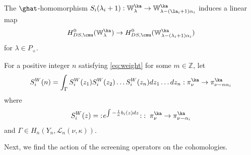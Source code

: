 \documentclass{amsart}
\newcommand{\Wak}[2]{\mathbb{W}_{#1}^{#2}}
\newcommand{\bra}{{\langle}}
\newcommand{\ket}{{\rangle}}
\newcommand{\+}{\mathop{\oplus}}
\renewcommand{\*}{{\otimes}}
\newcommand{\mc}{\mathcal}
\newcommand{\mf}{\mathfrak}
\newcommand{\g}{\mf{g}}
\newcommand{\affg}{\widehat{\mf{g}}}
\newcommand{\Z}{\mathbb{Z}}
\newcommand{\C}{\mathbb{C}}
\newcommand{\ra}{\rightarrow}
\newcommand{\lam}{\lambda}
\theoremstyle{theorem}
\newtheorem{Pro}[Th]{Proposition}
\theoremstyle{remark}
\numberwithin{equation}{section}
\begin{document}
%


The $\ghat$-homomorphism
$S_i(\lam_i+1):\Wak{\lam}{\ka}\ra \Wak{\lam-(\la_i+1)\alpha_i}{\ka}$
induces a linear map
\begin{align}
H_{DS,\cmu}^0(\Wak{\lam}{\ka})\ra
H_{DS,\cmu}^0(\Wak{\lam-(\lam_i+1)\alpha_i}{\ka})
\label{eq:induced-screaning}
\end{align}
for $\lam\in P_+$.

For a positive integer $n$ satisfying \eqref{eq:weight} for some $m\in
\Z$, let
\begin{multline}
S^W_i(n) =  \int_{\Gamma} S^W_i(z_1)S^W_i(z_2)\dots S^W_i(z_n)
 dz_1\dots dz_n: \pi^\ka_{\nu}\ra \pi^\ka_{\nu-n\alpha_i}
\label{eq:intertwiner3}
\end{multline}
where
\begin{equation}    \label{SiW}
S_{i}^W(z)= \; : \! e^{\int -\frac{1}{\kappa}b_i(z)dz}\!: \;
 : \; \pi^\ka_{\nu}\ra \pi^\ka_{\nu-\alpha_i}
\end{equation}
and $\Gamma\in H_{n}(Y_{n},\mc{L}_n(\nu,\kappa))$.

\medskip

Next, we find the action of the screening operators on the
cohomologies.
\end{document}
